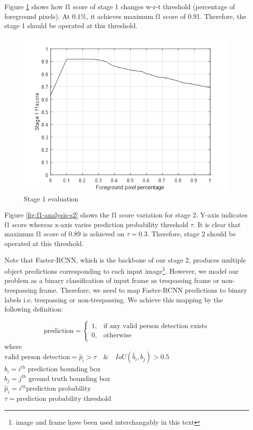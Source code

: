 Figure \ref{fig:f1-analysis-mog} shows how f1 score of stage 1 changes w-r-t threshold (percentage of foreground pixels). At $0.1\%$, it achieves maximum f1 score of 0.91. Therefore, the stage 1 should be operated at this threshold.

\begin{figure}
    \centering
    \includegraphics[width=\linewidth]{images/f1-analysis-mog.png}
    \caption{Stage 1 evaluation}
    \label{fig:f1-analysis-mog}
\end{figure}

Figure \ref{fig:f1-analysis-s2} shows the f1 score variation for stage 2. Y-axis indicates f1 score whereas x-axis varies prediction probability threshold $\tau$. It is clear that maximum f1 score of 0.89 is achieved on $\tau=0.3$. Therefore, stage 2 should be operated at this threshold.

Note that Faster-RCNN, which is the backbone of our stage 2, produces multiple object predictions corresponding to each input image\footnote{image and frame have been used interchangably in this text}. However, we model our problem as a binary classification of input frame as trespassing frame or non-trespassing frame. Therefore, we need to map Faster-RCNN predictions to binary labels i.e. trespassing or non-trespassing. We achieve this mapping by the following definition:

$$
\text{prediction} = 
\begin{cases}
1, &    \text{if any valid person detection exists} \\
0, &    \text{otherwise}
\end{cases}
$$
where \\
$\text{valid person detection} = \hat{p}_i>\tau \quad \& \quad IoU(\hat{b}_i,b_j)>0.5$ \\
$\hat{b}_i =i^{th} \text{ prediction bounding box}$ \\
$b_j =j^{th} \text{ ground truth bounding box}$ \\
$\hat{p}_i = i^{th} \text{prediction probability}$ \\
$\tau =  \text{prediction probability threshold}$

